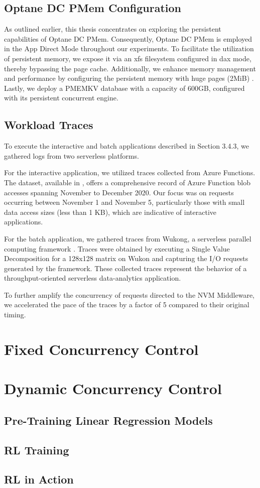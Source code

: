 \subsection{Optane DC PMem Configuration}
As outlined earlier, this thesis concentrates on exploring the persistent capabilities of Optane DC PMem. Consequently, Optane DC PMem is employed in the App Direct Mode throughout our experiments. To facilitate the utilization of persistent memory, we expose it via an xfs filesystem configured in dax mode, thereby bypassing the page cache. Additionally, we enhance memory management and performance by configuring the persistent memory with huge pages (2MiB) \cite{Speeding28:online}. Lastly, we deploy a PMEMKV database with a capacity of 600GB, configured with its persistent concurrent engine.

\subsection{Workload Traces}

To execute the interactive and batch applications described in Section 3.4.3, we gathered logs from two serverless platforms.

For the interactive application, we utilized traces collected from Azure Functions. The dataset, available in \cite{GitHubAz35:online}, offers a comprehensive record of Azure Function blob accesses spanning November to December 2020. Our focus was on requests occurring between November 1 and November 5, particularly those with small data access sizes (less than 1 KB), which are indicative of interactive applications.

For the batch application, we gathered traces from Wukong, a serverless parallel computing framework \cite{carver2020wukong}. Traces were obtained by executing a Single Value Decomposition for a 128x128 matrix on Wukon and capturing the I/O requests generated by the framework. These collected traces represent the behavior of a throughput-oriented serverless data-analytics application.

To further amplify the concurrency of requests directed to the NVM Middleware, we accelerated the pace of the traces by a factor of 5 compared to their original timing.

\section{Fixed Concurrency Control}

\section{Dynamic Concurrency Control}

\subsection*{Pre-Training Linear Regression Models}

\subsection*{RL Training}

\subsection*{RL in Action}
